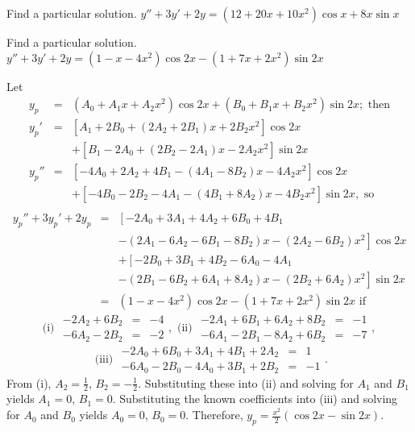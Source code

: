\documentclass{ximera}
\begin{document}
\begin{problem}\label{exer:5.5.13}   Find a particular solution. $y''+3y'+2y=(12+20x+10x^2)\cos x+8x\sin x$
\end{problem}

\begin{problem}\label{exer:5.5.14} Find a particular solution. $y''+3y'+2y=(1-x-4x^2)\cos2x-(1+7x+2x^2)\sin2x$

\begin{solution}
    Let
\begin{eqnarray*}
y_p&=&(A_0+A_1x+A_2x^2)\cos2x +(B_0+B_1x+B_2x^2)\sin2x;\mbox{ then}\\
y_p'&=&\left[A_1+2B_0+(2A_2+2B_1)x+2B_2x^2\right]\cos2x\\ &&
+\left[B_1-2A_0+(2B_2-2A_1)x-2A_2x^2\right]\sin2x\\
y_p''&=&\left[-4A_0+2A_2+4B_1 -(4A_1-8B_2)x-4A_2x^2\right]\cos2x\\
&&+ \left[-4B_0-2B_2-4A_1
-(4B_1+8A_2)x-4B_2x^2\right]\sin2x,\mbox{ so}\\
\end{eqnarray*}
\begin{eqnarray*}
y_p''+3y_p'+2y_p&=&\left[-2A_0+3A_1+4A_2+6B_0+4B_1\right.\\ &&\left.
-(2A_1-6A_2-6B_1-8B_2)x-
(2A_2-6B_2)x^2\right]\cos2x\\ &&
+\left[-2B_0+3B_1+4B_2-6A_0-4A_1\right.\\ &&\left.
-(2B_1-6B_2+6A_1+8A_2)x-(2B_2+6A_2)x^2\right]\sin2x\\
&=&(1-x-4x^2)\cos2x-(1+7x+2x^2)\sin2x \mbox{ if}
\end{eqnarray*}
$$
\mbox{(i) } \begin{array}{rcl}-2A_2+6B_2&=&-4
\\-6A_2-2B_2&=&-2\end{array},
\mbox{ (ii) } \begin{array}{rcr} -2A_1+6B_1+6A_2+8B_2&=&-1
\\-6A_1-2B_1-8A_2+6B_2&=&-7\end{array},
$$
$$
\mbox{ (iii) }
\begin{array}{rcr}-2A_0+6B_0+3A_1+4B_1+2A_2&=&1
\\-6A_0-2B_0-4A_0+3B_1+2B_2&=&-1\end{array}.
$$
From (i), $A_2=\frac{1}{2}$, $B_2=-\frac{1}{2}$. Substituting
these into (ii) and solving for $A_1$ and $B_1$ yields $A_1=0$,
$B_1=0$. Substituting the known coefficients into (iii) and solving
for $A_0$ and $B_0$ yields $A_0=0$, $B_0=0$. Therefore,
$y_p=\frac{x^2}{2}(\cos2x-\sin2x)$.
\end{solution}
\end{problem}
\end{document}
